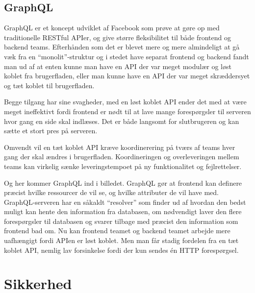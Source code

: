 \documentclass[../main]{subfiles}
\begin{document}
    \subsection{GraphQL}
        GraphQL er et koncept udviklet af Facebook som prøve at gøre op med traditionelle RESTful APIer, og give større fleksibilitet til både frontend og backend teams.
        \enskip
        Efterhånden som det er blevet mere og mere almindeligt at gå væk fra en \enquote{monolit}-struktur og i stedet have separat frontend og backend fandt man ud af at enten kunne man have en API der var meget modulær og løst koblet fra brugerfladen, eller man kunne have en API der var meget skræddersyet og tæt koblet til brugerfladen.

        Begge tilgang har sine svagheder, med en løst koblet API ender det med at være meget ineffektivt fordi frontend er nødt til at lave mange forespørgsler til serveren hvor gang en side skal indlæses.
        \enskip
        Det er både langsomt for slutbrugeren og kan sætte et stort pres på serveren.
        
        Omvendt vil en tæt koblet API kræve koordinerering på tværs af teams hver gang der skal ændres i brugerfladen.
        \enskip
        Koordineringen og overleveringen mellem teams kan virkelig sænke leveringstempoet på ny funktionalitet og fejlrettelser.

        Og her kommer GraphQL ind i billedet.
        \enskip
        GraphQL gør at frontend kan definere præcist hvilke ressourcer de vil se, og hvilke attributer de vil have med.
        \enskip
        GraphQL-serveren har en såkaldt \enquote{resolver} som finder ud af hvordan den bedst muligt kan hente den information fra databasen, om nødvendigt laver den flere forespørgsler til databasen og svarer tilbage med præcist den information som frontend bad om.
        \enskip
        Nu kan frontend teamet og backend teamet arbejde mere uafhængigt fordi APIen er løst koblet. Men man får stadig fordelen fra en tæt koblet API, nemlig lav forsinkelse fordi der kun sendes én HTTP forespørgsel.
    

\section{Sikkerhed}
\end{document}
